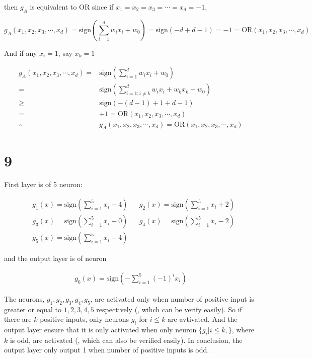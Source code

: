 \documentclass[fleqn,a4paper,12pt]{article}
\begin{document}
then $g_A$ is equivalent to OR since if $x_1 = x_2 = x_3 = \cdots = x_d = -1$,

\begin{equation*}
  g_A(x_1, x_2, x_3, \cdots, x_d) = \mathrm{sign}(\sum_{i=1}^d w_i x_i + w_0) = \mathrm{sign}(-d + d - 1) = -1 = \mathrm{OR}(x_1, x_2, x_3, \cdots, x_d)
\end{equation*}

And if any $x_i = 1$, say $x_k = 1$

\begin{align*}
  g_A(x_1, x_2, x_3, \cdots, x_d)
  =& \mathrm{sign}(\sum_{i=1}^d w_i x_i + w_0) \\
  =& \mathrm{sign}(\sum_{i=1; i \ne k}^d w_i x_i + w_k x_k + w_0) \\
  \geq& \mathrm{sign}(-(d - 1) + 1 + d - 1) \\
  =& +1 = \mathrm{OR}(x_1, x_2, x_3, \cdots, x_d) \\
  \therefore& g_A(x_1, x_2, x_3, \cdots, x_d) = \mathrm{OR}(x_1, x_2, x_3, \cdots, x_d)
\end{align*}

\section*{9}

First layer is of 5 neuron:

\begin{align*}
  & g_1(x) = \mathrm{sign} \left( \sum_{i=1}^5 x_i + 4 \right) 
  && g_2(x) = \mathrm{sign} \left( \sum_{i=1}^5 x_i + 2 \right) \\  
  & g_3(x) = \mathrm{sign} \left( \sum_{i=1}^5 x_i + 0 \right) 
  && g_4(x) = \mathrm{sign} \left( \sum_{i=1}^5 x_i - 2 \right) \\
  & g_5(x) = \mathrm{sign} \left( \sum_{i=1}^5 x_i - 4 \right) 
\end{align*}

and the output layer is of neuron

\begin{align*}
  g_6(x) = \mathrm{sign} \left( - \sum_{i=1}^5 (-1)^i x_i \right)
\end{align*}

The neurons, $g_1, g_2, g_3, g_4, g_5$, are activated only when number of positive input is greater or equal to $1, 2, 3, 4, 5$ respectively (, wihch can be verify easily). So if there are $k$ positive inputs, only neurons $g_i$ for $i \leq k$ are avtivated. And the output layer ensure that it is only activated when only neuron $\{ g_i | i \leq k, \}$, where $k$ is odd, are activated (, which can also be verified easily). In conclusion, the output layer only output 1 when number of positive inputs is odd.
\end{document}
